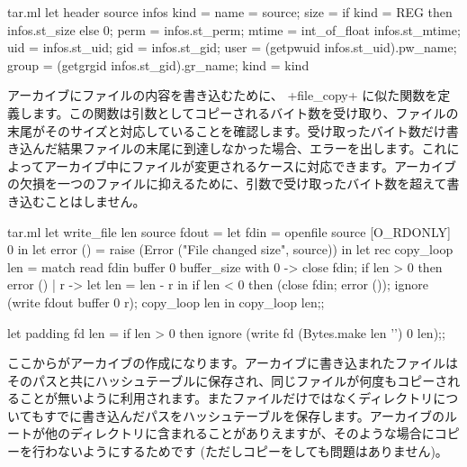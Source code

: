 \begin{answer}
%
\begin{listingcodefile}{tar.ml}
let header source infos kind = {
  name = source;
  size = if kind = REG then infos.st_size else 0;
  perm = infos.st_perm;
  mtime = int_of_float infos.st_mtime;
  uid = infos.st_uid;
  gid = infos.st_gid;
  user = (getpwuid infos.st_uid).pw_name;
  group = (getgrgid infos.st_gid).gr_name;
  kind = kind }
\end{listingcodefile}
%
アーカイブにファイルの内容を書き込むために、 \ml+file_copy+ に似た関数を定義します。この関数は引数としてコピーされるバイト数を受け取り、ファイルの末尾がそのサイズと対応していることを確認します。受け取ったバイト数だけ書き込んだ結果ファイルの末尾に到達しなかった場合、エラーを出します。これによってアーカイブ中にファイルが変更されるケースに対応できます。アーカイブの欠損を一つのファイルに抑えるために、引数で受け取ったバイト数を超えて書き込むことはしません。
%
\begin{listingcodefile}{tar.ml}
let write_file len source fdout =
  let fdin = openfile source [O_RDONLY] 0 in
  let error () = raise (Error ("File changed size", source)) in
  let rec copy_loop len =
    match read fdin buffer 0 buffer_size with
      0 ->
        close fdin; if len > 0 then error ()
    | r ->
        let len = len - r  in
        if len < 0 then (close fdin; error ());
        ignore (write fdout buffer 0 r); copy_loop len in
  copy_loop len;;

let padding fd len =
  if len > 0 then ignore (write fd (Bytes.make len '') 0 len);;
\end{listingcodefile}
%
ここからがアーカイブの作成になります。アーカイブに書き込まれたファイルはそのパスと共にハッシュテーブルに保存され、同じファイルが何度もコピーされることが無いように利用されます。またファイルだけではなくディレクトリについてもすでに書き込んだパスをハッシュテーブルを保存します。アーカイブのルートが他のディレクトリに含まれることがありえますが、そのような場合にコピーを行わないようにするためです (ただしコピーをしても問題はありません)。


\end{answer}
